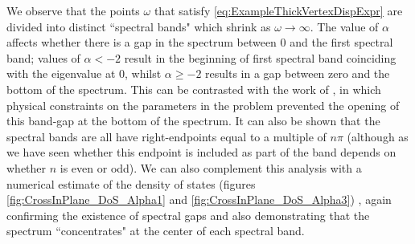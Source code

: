 We observe that the points $\omega$ that satisfy \eqref{eq:ExampleThickVertexDispExpr} are divided into distinct ``spectral bands" which shrink as $\omega\rightarrow\infty$.
The value of $\alpha$ affects whether there is a gap in the spectrum between 0 and the first spectral band; values of $\alpha<-2$ result in the beginning of first spectral band coinciding with the eigenvalue at 0, whilst $\alpha\geq -2$ results in a gap between zero and the bottom of the spectrum.
This can be contrasted with the work of \cite{cherednichenko2019time}, in which physical constraints on the parameters in the problem prevented the opening of this band-gap at the bottom of the spectrum.
It can also be shown that the spectral bands are all have right-endpoints equal to a multiple of $n\pi$ (although as we have seen whether this endpoint is included as part of the band depends on whether $n$ is even or odd).
We can also complement this analysis with a numerical estimate of the density of states (figures \ref{fig:CrossInPlane_DoS_Alpha1} and \ref{fig:CrossInPlane_DoS_Alpha3}) , again confirming the existence of spectral gaps and also demonstrating that the spectrum ``concentrates" at the center of each spectral band.
